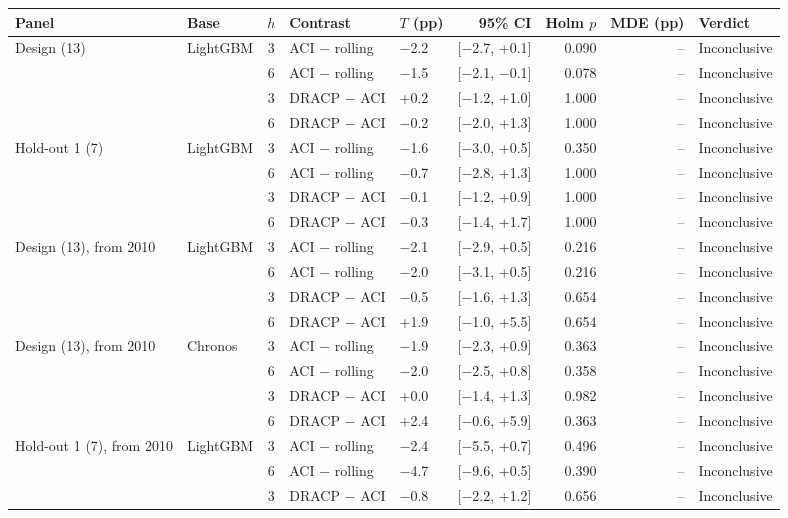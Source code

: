 \begin{tabular}{llcllrrrl}
\toprule
Panel & Base & $h$ & Contrast & $T$ (pp) & 95\% CI & Holm $p$ & MDE (pp) & Verdict \\
\midrule
Design (13) & LightGBM & 3 & ACI $-$ rolling & $-$2.2 & [$-$2.7, +0.1] & 0.090 & -- & Inconclusive \\
 &  & 6 & ACI $-$ rolling & $-$1.5 & [$-$2.1, $-$0.1] & 0.078 & -- & Inconclusive \\
 &  & 3 & DRACP $-$ ACI & +0.2 & [$-$1.2, +1.0] & 1.000 & -- & Inconclusive \\
 &  & 6 & DRACP $-$ ACI & $-$0.2 & [$-$2.0, +1.3] & 1.000 & -- & Inconclusive \\
\midrule
Hold-out 1 (7) & LightGBM & 3 & ACI $-$ rolling & $-$1.6 & [$-$3.0, +0.5] & 0.350 & -- & Inconclusive \\
 &  & 6 & ACI $-$ rolling & $-$0.7 & [$-$2.8, +1.3] & 1.000 & -- & Inconclusive \\
 &  & 3 & DRACP $-$ ACI & $-$0.1 & [$-$1.2, +0.9] & 1.000 & -- & Inconclusive \\
 &  & 6 & DRACP $-$ ACI & $-$0.3 & [$-$1.4, +1.7] & 1.000 & -- & Inconclusive \\
\midrule
Design (13), from 2010 & LightGBM & 3 & ACI $-$ rolling & $-$2.1 & [$-$2.9, +0.5] & 0.216 & -- & Inconclusive \\
 &  & 6 & ACI $-$ rolling & $-$2.0 & [$-$3.1, +0.5] & 0.216 & -- & Inconclusive \\
 &  & 3 & DRACP $-$ ACI & $-$0.5 & [$-$1.6, +1.3] & 0.654 & -- & Inconclusive \\
 &  & 6 & DRACP $-$ ACI & +1.9 & [$-$1.0, +5.5] & 0.654 & -- & Inconclusive \\
\midrule
Design (13), from 2010 & Chronos & 3 & ACI $-$ rolling & $-$1.9 & [$-$2.3, +0.9] & 0.363 & -- & Inconclusive \\
 &  & 6 & ACI $-$ rolling & $-$2.0 & [$-$2.5, +0.8] & 0.358 & -- & Inconclusive \\
 &  & 3 & DRACP $-$ ACI & +0.0 & [$-$1.4, +1.3] & 0.982 & -- & Inconclusive \\
 &  & 6 & DRACP $-$ ACI & +2.4 & [$-$0.6, +5.9] & 0.363 & -- & Inconclusive \\
\midrule
Hold-out 1 (7), from 2010 & LightGBM & 3 & ACI $-$ rolling & $-$2.4 & [$-$5.5, +0.7] & 0.496 & -- & Inconclusive \\
 &  & 6 & ACI $-$ rolling & $-$4.7 & [$-$9.6, +0.5] & 0.390 & -- & Inconclusive \\
 &  & 3 & DRACP $-$ ACI & $-$0.8 & [$-$2.2, +1.2] & 0.656 & -- & Inconclusive \\

\end{tabular}
